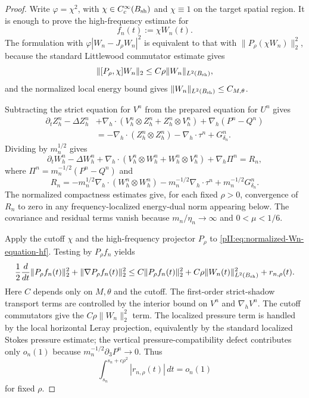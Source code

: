 \documentclass[11pt]{article}
\numberwithin{equation}{section}
\theoremstyle{plain}
\theoremstyle{definition}
\theoremstyle{remark}
\newcommand{\dt}{\,dt}
\begin{document}
\begin{proof}
Write $\varphi=\chi^2$, with $\chi\in C_c^\infty(B_{\rm sh})$ and $\chi\equiv1$ on the target spatial region.  It is enough to prove the high-frequency estimate for
\[
        f_n(t):=\chi W_n(t).
\]
The formulation with $\varphi |W_n-J_\rho W_n|^2$ is equivalent to that with $\|P_\rho(\chi W_n)\|_2^2$, because the standard Littlewood commutator estimate gives
\[
        \|[P_\rho,\chi]W_n\|_2
        \le C\rho\|W_n\|_{L^2(B_{\rm sh})},
\]
and the normalized local energy bound gives $\|W_n\|_{L^2(B_{\rm sh})}\le C_{M,\theta}$.

Subtracting the strict equation for $V^n$ from the prepared equation for $U^n$ gives
\[
\begin{aligned}
\partial_tZ^n_h-\Delta Z^n_h
&+\nabla_h\cdot(V_h^n\otimes Z_h^n+Z_h^n\otimes V_h^n)
+\nabla_h(P^n-Q^n) \\
&= -\nabla_h\cdot(Z_h^n\otimes Z_h^n)-\nabla_h\cdot\tau^n+G^n_{\delta_n}.
\end{aligned}
\]
Dividing by $m_n^{1/2}$ gives
\begin{equation}\label{pII:eq:normalized-Wn-equation-hf}
\partial_tW^n_h-\Delta W^n_h
+\nabla_h\cdot(V_h^n\otimes W_h^n+W_h^n\otimes V_h^n)
+\nabla_h\Pi^n=R_n,
\end{equation}
where $\Pi^n=m_n^{-1/2}(P^n-Q^n)$ and
\[
        R_n=-m_n^{1/2}\nabla_h\cdot(W_h^n\otimes W_h^n)
        -m_n^{-1/2}\nabla_h\cdot\tau^n
        +m_n^{-1/2}G^n_{\delta_n}.
\]
The normalized compactness estimates give, for each fixed $\rho>0$, convergence of $R_n$ to zero in any frequency-localized energy-dual norm appearing below.  The covariance and residual terms vanish because $m_n/\eta_n\to\infty$ and $0<\mu<1/6$.

Apply the cutoff $\chi$ and the high-frequency projector $P_\rho$ to \eqref{pII:eq:normalized-Wn-equation-hf}.  Testing by $P_\rho f_n$ yields
\begin{equation}\label{pII:eq:hf-energy-diff-ineq}
        \frac12\frac{d}{dt}\|P_\rho f_n(t)\|_2^2
        +\|\nabla P_\rho f_n(t)\|_2^2
        \le C\|P_\rho f_n(t)\|_2^2
        +C\rho\|W_n(t)\|_{L^2(B_{\rm sh})}^2
        +r_{n,\rho}(t).
\end{equation}
Here $C$ depends only on $M,\theta$ and the cutoff.  The first-order strict-shadow transport terms are controlled by the interior bound on $V^n$ and $\nabla_hV^n$.  The cutoff commutators give the $C\rho\|W_n\|_2^2$ term.  The localized pressure term is handled by the local horizontal Leray projection, equivalently by the standard localized Stokes pressure estimate; the vertical pressure-compatibility defect contributes only $o_n(1)$ because $m_n^{-1/2}\partial_3P^n\to0$.  Thus
\[
        \int_{s_n}^{s_n+c\rho^2}|r_{n,\rho}(t)|\dt=o_n(1)
\]
for fixed $\rho$.


\end{proof}
\end{document}
